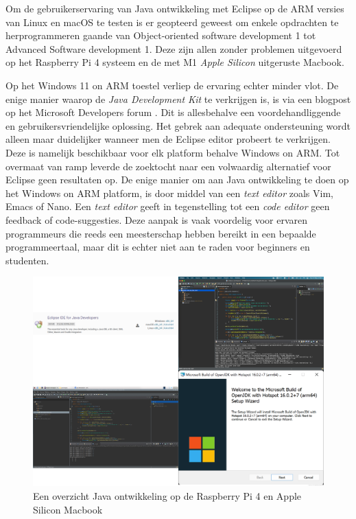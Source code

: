 Om de gebruikerservaring van Java ontwikkeling met Eclipse op de ARM versies van Linux en macOS te testen is er geopteerd geweest om enkele opdrachten te herprogrammeren gaande van Object-oriented software development 1 tot Advanced Software development 1. Deze zijn allen zonder problemen uitgevoerd op het Raspberry Pi 4 systeem en de met M1 \textit{Apple Silicon} uitgeruste Macbook.

Op het Windows 11 on ARM toestel verliep de ervaring echter minder vlot. De enige manier waarop de \textit{Java Development Kit} te verkrijgen is, is via een blogpost op het 
Microsoft Developers forum \autocite{Borges2020}. Dit is allesbehalve een voordehandliggende en gebruikersvriendelijke oplossing. Het gebrek aan adequate ondersteuning wordt alleen maar duidelijker wanneer men de Eclipse editor probeert te verkrijgen. Deze is namelijk beschikbaar voor elk platform behalve Windows on ARM. Tot overmaat van ramp leverde de zoektocht naar een volwaardig alternatief voor Eclipse geen resultaten op. De enige manier om aan Java ontwikkeling te doen op het Windows on ARM platform, is door middel van een \textit{text editor} zoals Vim, Emacs of Nano. Een \textit{text editor} geeft in tegenstelling tot een \textit{code editor} geen feedback of code-suggesties. Deze aanpak is vaak voordelig voor ervaren programmeurs die reeds een meesterschap hebben bereikt in een bepaalde programmeertaal, maar dit is echter niet aan te raden voor beginners en studenten.

\begin{figure}[!h]
	\centering
	\includegraphics[width=\linewidth]{img/java_development.png}
	\caption{Een overzicht Java ontwikkeling op de Raspberry Pi 4 en Apple Silicon Macbook \autocite{EclipseFoundation2022}}
\end{figure}

